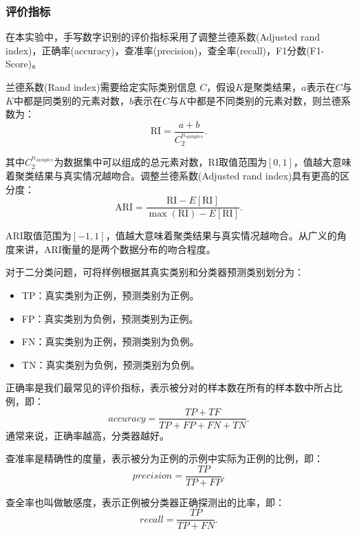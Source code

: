 \documentclass[UTF8]{ctexart}
\begin{document}
\subsubsection{评价指标}

在本实验中，手写数字识别的评价指标采用了调整兰德系数(Adjusted rand index)，正确率(accuracy)，查准率(precision)，查全率(recall)，F1分数(F1-Score)。

兰德系数(Rand index)需要给定实际类别信息 $C$，假设$K$是聚类结果，$a$表示在$C$与$K$中都是同类别的元素对数，$b$表示在$C$与$K$中都是不同类别的元素对数，则兰德系数为：
\begin{equation}
\mathrm{RI}=\frac{a+b}{C_{2}^{n_{samples}}}.
\end{equation}

其中$C_{2}^{n_{samples}}$为数据集中可以组成的总元素对数，RI取值范围为$[0,1]$，值越大意味着聚类结果与真实情况越吻合。调整兰德系数(Adjusted rand index)具有更高的区分度：
\begin{equation}
\mathrm{ARI}=\frac{\mathrm{RI}-E[\mathrm{RI}]}{\max (\mathrm{RI})-E[\mathrm{RI}]}.
\end{equation}

ARI取值范围为$[-1,1]$，值越大意味着聚类结果与真实情况越吻合。从广义的角度来讲，ARI衡量的是两个数据分布的吻合程度。

对于二分类问题，可将样例根据其真实类别和分类器预测类别划分为：
\begin{itemize}
	\item TP：真实类别为正例，预测类别为正例。
	\item FP：真实类别为负例，预测类别为正例。
	\item FN：真实类别为正例，预测类别为负例。
	\item TN：真实类别为负例，预测类别为负例。
\end{itemize}

正确率是我们最常见的评价指标，表示被分对的样本数在所有的样本数中所占比例，即：
\begin{equation}
accuracy = \frac{TP+TF}{TP+FP+FN+TN}.
\end{equation}
通常来说，正确率越高，分类器越好。

查准率是精确性的度量，表示被分为正例的示例中实际为正例的比例，即：
\begin{equation}
	precision = \frac{TP}{TP+FP}.
\end{equation}

查全率也叫做敏感度，表示正例被分类器正确探测出的比率，即：
\begin{equation}
	recall = \frac{TP}{TP+FN}.
\end{equation}
\end{document}
